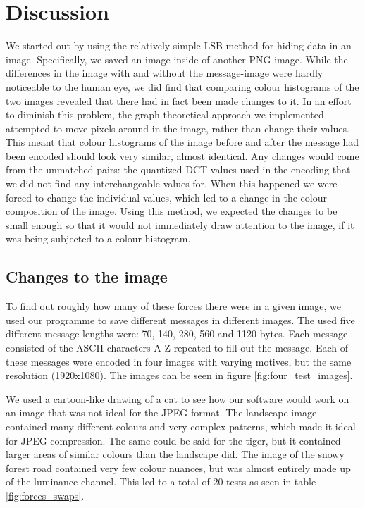 \section{Discussion}
We started out by using the relatively simple LSB-method for hiding data in an image.
Specifically, we saved an image inside of another PNG-image.
While the differences in the image with and without the message-image were hardly noticeable to the human eye, we did find that comparing colour histograms of the two images revealed that there had in fact been made changes to it.
In an effort to diminish this problem, the graph-theoretical approach we implemented attempted to move pixels around in the image, rather than change their values.
This meant that colour histograms of the image before and after the message had been encoded should look very similar, almost identical.
Any changes would come from the unmatched pairs: the quantized DCT values used in the encoding that we did not find any interchangeable values for.
When this happened we were forced to change the individual values, which led to a change in the colour composition of the image.
Using this method, we expected the changes to be small enough so that it would not immediately draw attention to the image, if it was being subjected to a colour histogram.

\subsection{Changes to the image}
To find out roughly how many of these forces there were in a given image, we used our programme to save different messages in different images.
The used five different message lengths were: 70, 140, 280, 560 and 1120 bytes.
Each message consisted of the ASCII characters A-Z repeated to fill out the message.
Each of these messages were encoded in four images with varying motives, but the same resolution (1920x1080).
The images can be seen in figure \ref{fig:four_test_images}.

We used a cartoon-like drawing of a cat to see how our software would work on an image that was not ideal for the JPEG format.
The landscape image contained many different colours and very complex patterns, which made it ideal for JPEG compression.
The same could be said for the tiger, but it contained larger areas of similar colours than the landscape did.
The image of the snowy forest road contained very few colour nuances, but was almost entirely made up of the luminance channel.
This led to a total of 20 tests as seen in table \ref{fig:forces_swaps}.

